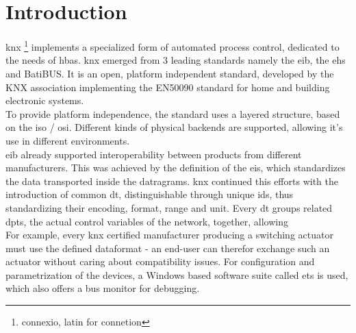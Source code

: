 \section{Introduction}

\gls{knx} \footnote{connexio, latin for connetion} implements a specialized form of automated process control, dedicated to the needs of \gls{hbas}. \gls{knx}
emerged from 3 leading standards namely the \gls{eib}, the \gls{ehs} and BatiBUS. It is an open, platform independent standard,
developed by the KNX association implementing the EN50090 standard for home and building electronic systems.
\\
To provide platform independence, the standard uses a layered structure, based on the \gls{iso} / \gls{osi}. Different kinds of physical backends are supported,
allowing it's use in different environments.
\\
\gls{eib} already supported interoperability between products from different manufacturers. This was achieved by
the definition of the \gls{eis}, which standardizes
the data transported inside the datragrams. \gls{knx} continued this efforts with the introduction of common \gls{dt}, distinguishable through unique ids, thus
standardizing their encoding, format, range and unit.
Every \gls{dt} groups related \glspl{dpt}, the actual control variables of the network, together, allowing 
\\
For example, every \gls{knx} 
certified manufacturer producing a switching actuator must use the defined dataformat - an end-user can therefor exchange such an actuator without caring
about compatibility issues. For configuration and parametrization of the devices, a Windows based software suite called \gls{ets} is used, which also offers
a bus monitor for debugging.
